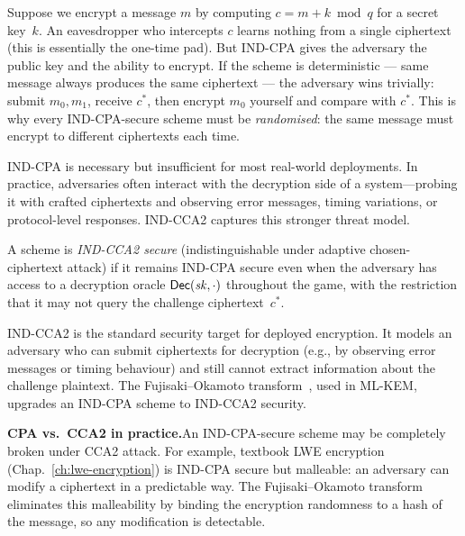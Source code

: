 \begin{example}
\label{ex:fails-ind-cpa}
Suppose we encrypt a message $m$ by computing $c = m + k \bmod q$ for a secret key~$k$.  An eavesdropper who intercepts $c$ learns nothing from a single ciphertext (this is essentially the one-time pad).  But IND-CPA gives the adversary the public key and the ability to encrypt.  If the scheme is deterministic --- same message always produces the same ciphertext --- the adversary wins trivially: submit $m_0, m_1$, receive $c^*$, then encrypt $m_0$ yourself and compare with $c^*$.  This is why every IND-CPA-secure scheme must be \emph{randomised}: the same message must encrypt to different ciphertexts each time.
\end{example}

IND-CPA is necessary but insufficient for most real-world deployments.  In practice, adversaries often interact with the decryption side of a system---probing it with crafted ciphertexts and observing error messages, timing variations, or protocol-level responses.  IND-CCA2 captures this stronger threat model.

\begin{definition}
\label{def:ind-cca2}
A scheme is \emph{IND-CCA2 secure} (indistinguishable under adaptive chosen-ciphertext attack) if it remains IND-CPA secure even when the adversary has access to a decryption oracle $\mathsf{Dec}(\mathit{sk}, \cdot)$ throughout the game, with the restriction that it may not query the challenge ciphertext~$c^*$.
\end{definition}

IND-CCA2 is the standard security target for deployed encryption.  It models an adversary who can submit ciphertexts for decryption (e.g., by observing error messages or timing behaviour) and still cannot extract information about the challenge plaintext.  The Fujisaki--Okamoto transform~\cite{FujisakiOkamoto1999}, used in ML-KEM, upgrades an IND-CPA scheme to IND-CCA2 security.

\begin{svgraybox}
\textbf{CPA vs.\ CCA2 in practice.}\enspace An IND-CPA-secure scheme may be completely broken under CCA2 attack.  For example, textbook LWE encryption (Chap.~\ref{ch:lwe-encryption}) is IND-CPA secure but malleable: an adversary can modify a ciphertext in a predictable way.  The Fujisaki--Okamoto transform eliminates this malleability by binding the encryption randomness to a hash of the message, so any modification is detectable.
\end{svgraybox}

